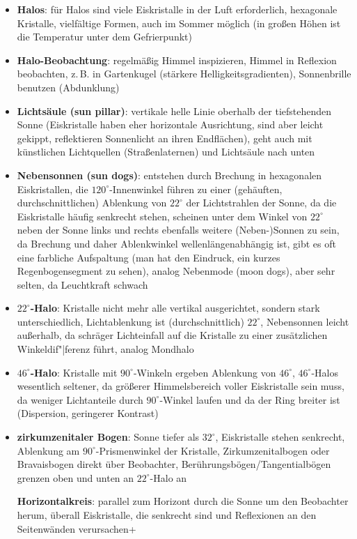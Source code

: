 \begin{itemize}
    \item
    \textbf{Halos}:
    für Halos sind viele Eiskristalle in der Luft erforderlich,
    hexagonale Kristalle, vielfältige Formen, auch im Sommer möglich
    (in großen Höhen ist die Temperatur unter dem Gefrierpunkt)
    
    \item
    \textbf{Halo-Beobachtung}:
    regelmäßig Himmel inspizieren, Himmel in Reflexion beobachten, z.\,B. in
    Gartenkugel (stärkere Helligkeitsgradienten), Sonnenbrille benutzen
    (Abdunklung)
    
    \item
    \textbf{Lichtsäule (sun pillar)}:
    vertikale helle Linie oberhalb der tiefstehenden Sonne
    (Eiskristalle haben eher horizontale Ausrichtung, sind aber leicht
    gekippt, reflektieren Sonnenlicht an ihren Endflächen),
    geht auch mit künstlichen Lichtquellen (Straßenlaternen) und
    Lichtsäule nach unten
    
    \item
    \textbf{Nebensonnen (sun dogs)}:
    entstehen durch Brechung in hexagonalen Eiskristallen,
    die $120^\circ$-Innenwinkel führen zu einer (gehäuften, durchschnittlichen)
    Ablenkung von $22^\circ$ der Lichtstrahlen der Sonne, da die
    Eiskristalle häufig senkrecht stehen, scheinen unter dem Winkel von
    $22^\circ$ neben der Sonne links und rechts ebenfalls weitere
    (Neben-)Sonnen zu sein,
    da Brechung und daher Ablenkwinkel wellenlängenabhängig ist,
    gibt es oft eine farbliche Aufspaltung
    (man hat den Eindruck, ein kurzes Regenbogensegment zu sehen),
    analog Nebenmode (moon dogs), aber sehr selten, da Leuchtkraft schwach
    
    \item
    \textbf{$22^\circ$-Halo}:
    Kristalle nicht mehr alle vertikal ausgerichtet,
    sondern stark unterschiedlich, Lichtablenkung ist (durchschnittlich)
    $22^\circ$,
    Nebensonnen leicht außerhalb, da schräger Lichteinfall auf die Kristalle
    zu einer zusätzlichen Winkeldif"|ferenz führt,
    analog Mondhalo
    
    \item
    \textbf{$46^\circ$-Halo}:
    Kristalle mit $90^\circ$-Winkeln ergeben Ablenkung von $46^\circ$,
    $46^\circ$-Halos wesentlich seltener, da
    größerer Himmelsbereich voller Eiskristalle sein muss,
    da weniger Lichtanteile durch $90^\circ$-Winkel laufen
    und da der Ring breiter ist (Dispersion, geringerer Kontrast)
    
    \item
    \textbf{zirkumzenitaler Bogen}:
    Sonne tiefer als $32^\circ$, Eiskristalle stehen senkrecht,
    Ablenkung am $90^\circ$-Prismenwinkel der Kristalle,
    Zirkumzenitalbogen oder Bravaisbogen direkt über Beobachter,
    Berührungsbögen/Tangentialbögen grenzen oben und unten an $22^\circ$-Halo
    an
    
    \textbf{Horizontalkreis}:
    parallel zum Horizont durch die Sonne um den Beobachter herum,
    überall Eiskristalle, die senkrecht sind und Reflexionen an den
    Seitenwänden verursachen+
\end{itemize}

\pagebreak
